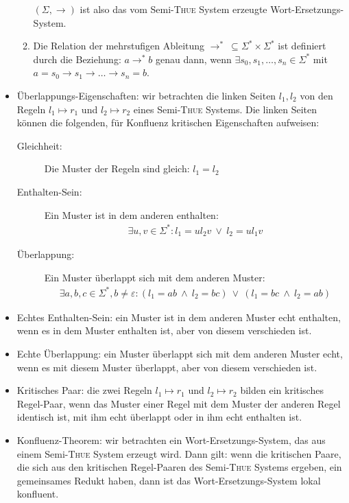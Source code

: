 \documentclass[
  a4paper,
  11pt,
]{scrartcl}
\begin{document}
\begin{itemize}
\begin{enumerate}
        $(\Sigma, \rightarrow)$ ist also das vom Semi-\textsc{Thue} System
        erzeugte Wort-Ersetzungs-System.

      \item Die Relation der mehrstufigen Ableitung $\rightarrow^* \ \subseteq
        \Sigma^* \times \Sigma^*$ ist definiert durch die Beziehung: $a
        \rightarrow^* b$ genau dann, wenn $\exists s_0, s_1, \dots, s_n \in
        \Sigma^*$ mit $a = s_0 \rightarrow s_1 \rightarrow \dots \rightarrow s_n
        = b$.
    \end{enumerate}

  \item Überlappungs-Eigenschaften: wir betrachten die linken Seiten $l_1, l_2$
    von den Regeln $l_1 \mapsto r_1$ und $l_2 \mapsto r_2$ eines
    Semi-\textsc{Thue} Systems. Die linken Seiten können die folgenden, für
    Konfluenz kritischen Eigenschaften aufweisen:
    \begin{description}
      \item[Gleichheit:] Die Muster der Regeln sind gleich: $l_1 = l_2$
      \item[Enthalten-Sein:] Ein Muster ist in dem anderen enthalten:
        \begin{align*}
          \exists u,v \in \Sigma^*: l_1 = u l_2 v \ \lor \ l_2 = u l_1 v
        \end{align*}
      \item[Überlappung:] Ein Muster überlappt sich mit dem anderen Muster:
        \begin{align*}
          \exists a,b,c \in \Sigma^*, b \neq \varepsilon:
          (l_1 = ab \ \land \ l_2 = bc) \ \lor \ (l_1 = bc \ \land \ l_2 = ab)
        \end{align*}
    \end{description}

  \item Echtes Enthalten-Sein: ein Muster ist in dem anderen Muster echt
    enthalten, wenn es in dem Muster enthalten ist, aber von diesem verschieden
    ist.

  \item Echte Überlappung: ein Muster überlappt sich mit dem anderen Muster
    echt, wenn es mit diesem Muster überlappt, aber von diesem verschieden ist.

  \item Kritisches Paar: die zwei Regeln $l_1 \mapsto r_1$ und $l_2 \mapsto r_2$
    bilden ein kritisches Regel-Paar, wenn das Muster einer Regel mit dem Muster
    der anderen Regel identisch ist, mit ihm echt überlappt oder in ihm echt
    enthalten ist.

  \item Konfluenz-Theorem: wir betrachten ein Wort-Ersetzungs-System, das aus
    einem Semi-\textsc{Thue} System erzeugt wird. Dann gilt: wenn die kritischen
    Paare, die sich aus den kritischen Regel-Paaren des Semi-\textsc{Thue}
    Systems ergeben, ein gemeinsames Redukt haben, dann ist das
    Wort-Ersetzungs-System lokal konfluent.
\end{itemize}
\end{document}
